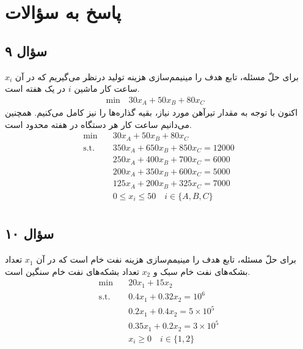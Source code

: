 \def \course {برنامه ریزی خطی}
\def \titlename {تمرین‌های تحویلی فصل ۱}
\def \name {ابراهیم نجاتی}
\def \studentnumber{۹۸۰۰۰۰۰۰۰۰}





\section*{پاسخ به سؤالات}
\subsection*{سؤال ۹}
برای حلّ مسئله، تابع هدف را مینیمم‌سازی هزینه تولید درنظر می‌گیریم که در آن $x_{i}$ ساعت کار ماشین $i$ در یک هفته است.
\begin{align*}
  \text{min} \quad
  30x_{A} + 50x_{B} + 80x_{C}&
\end{align*}
اکنون با توجه به مقدار تیرآهن مورد نیاز، بقیه گذاره‌ها را نیز کامل می‌کنیم. همچنین می‌دانیم ساعت کار هر دستگاه در هفته محدود است.
\begin{align*}
  \text{min} \quad
  &30x_{A} + 50x_{B} + 80x_{C} \\
  \text{s.t.} \quad
  &350x_{A} + 650x_{B} + 850x_{C} = 12000 \\
  &250x_{A} + 400x_{B} + 700x_{C} = 6000 \\
  &200x_{A} + 350x_{B} + 600x_{C} = 5000 \\
  &125x_{A} + 200x_{B} + 325x_{C} = 7000 \\
  &0 \leq x_{i} \leq 50 \quad
  i \in \{A, B, C\} \\
\end{align*}

\subsection*{سؤال ۱۰}
برای حلّ مسئله، تابع هدف را مینیمم‌سازی هزینه نفت خام است که در آن $x_{1}$ تعداد بشکه‌های نفت خام سبک و $x_{2}$ تعداد بشکه‌های نفت خام سنگین است.
\begin{align*}
  \text{min} \quad
  &20x_{1} + 15x_{2} \\
  \text{s.t.} \quad
  &0.4x_{1} + 0.32x_{2} = 10^{6} \\
  &0.2x_{1} + 0.4x_{2} = 5 \times 10^{5} \\
  &0.35x_{1} + 0.2x_{2} = 3 \times 10^{5} \\
  &x_{i} \geq 0 \quad
  i \in \{1, 2\} \\
\end{align*}


